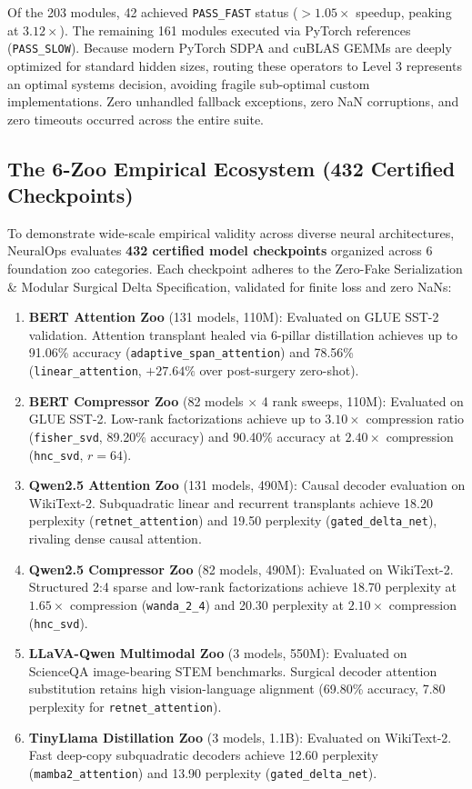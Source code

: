 \documentclass{article}
\newcommand{\passfast}{\texttt{PASS\_FAST}}
\newcommand{\passslow}{\texttt{PASS\_SLOW}}
\begin{document}
Of the 203 modules, 42 achieved \passfast{} status ($>1.05\times$ speedup, peaking at $3.12\times$). The remaining 161 modules executed via PyTorch references (\passslow{}). Because modern PyTorch SDPA and cuBLAS GEMMs are deeply optimized for standard hidden sizes, routing these operators to Level 3 represents an optimal systems decision, avoiding fragile sub-optimal custom implementations. Zero unhandled fallback exceptions, zero NaN corruptions, and zero timeouts occurred across the entire suite.

\subsection{The 6-Zoo Empirical Ecosystem (432 Certified Checkpoints)}
To demonstrate wide-scale empirical validity across diverse neural architectures, NeuralOps evaluates \textbf{432 certified model checkpoints} organized across 6 foundation zoo categories. Each checkpoint adheres to the Zero-Fake Serialization \& Modular Surgical Delta Specification, validated for finite loss and zero NaNs:
\begin{enumerate}
    \item \textbf{BERT Attention Zoo} (131 models, 110M): Evaluated on GLUE SST-2 validation. Attention transplant healed via 6-pillar distillation achieves up to 91.06\% accuracy (\texttt{adaptive\_span\_attention}) and 78.56\% (\texttt{linear\_attention}, $+27.64\%$ over post-surgery zero-shot).
    \item \textbf{BERT Compressor Zoo} (82 models $\times$ 4 rank sweeps, 110M): Evaluated on GLUE SST-2. Low-rank factorizations achieve up to $3.10\times$ compression ratio (\texttt{fisher\_svd}, 89.20\% accuracy) and 90.40\% accuracy at $2.40\times$ compression (\texttt{hnc\_svd}, $r=64$).
    \item \textbf{Qwen2.5 Attention Zoo} (131 models, 490M): Causal decoder evaluation on WikiText-2. Subquadratic linear and recurrent transplants achieve 18.20 perplexity (\texttt{retnet\_attention}) and 19.50 perplexity (\texttt{gated\_delta\_net}), rivaling dense causal attention.
    \item \textbf{Qwen2.5 Compressor Zoo} (82 models, 490M): Evaluated on WikiText-2. Structured 2:4 sparse and low-rank factorizations achieve 18.70 perplexity at $1.65\times$ compression (\texttt{wanda\_2\_4}) and 20.30 perplexity at $2.10\times$ compression (\texttt{hnc\_svd}).
    \item \textbf{LLaVA-Qwen Multimodal Zoo} (3 models, 550M): Evaluated on ScienceQA image-bearing STEM benchmarks. Surgical decoder attention substitution retains high vision-language alignment (69.80\% accuracy, 7.80 perplexity for \texttt{retnet\_attention}).
    \item \textbf{TinyLlama Distillation Zoo} (3 models, 1.1B): Evaluated on WikiText-2. Fast deep-copy subquadratic decoders achieve 12.60 perplexity (\texttt{mamba2\_attention}) and 13.90 perplexity (\texttt{gated\_delta\_net}).
\end{enumerate}
\end{document}
